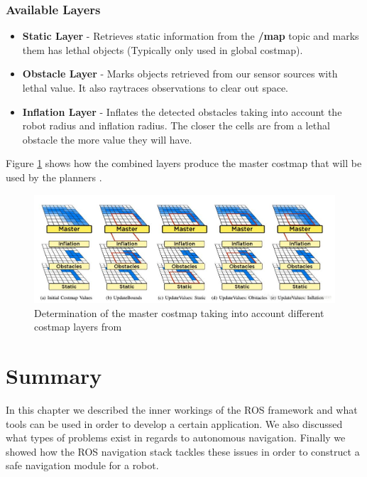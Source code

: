 \subsubsection*{Available Layers}
\begin{itemize}
    \item \textbf{Static Layer} - Retrieves static information from the \textbf{/map} topic and marks them has lethal objects (Typically only used in global costmap).
    \item \textbf{Obstacle Layer} - Marks objects retrieved from our sensor sources with lethal value. It also raytraces observations to clear out space.
    \item \textbf{Inflation Layer} - Inflates the detected obstacles taking into account the robot radius and inflation radius. The closer the cells are from a lethal obstacle the more value they will have.
    
\end{itemize}

Figure \ref{fig:layers1} shows how the combined layers produce the master costmap that will be used by the planners \cite{lu2014layered}.

\begin{figure}[!htb]
    \centering
    \includegraphics[width=\linewidth]{imgs/chapter3/layers1.png}
    \caption[Determination of the master costmap taking into account different costmap layers]{Determination of the master costmap taking into account different costmap layers from \cite{lu2014layered}}
    \label{fig:layers1}
\end{figure}
\section{Summary}
In this chapter we described the inner workings of the ROS framework and what tools can be used in order to develop a certain application. We also discussed what types of problems exist in regards to autonomous navigation. Finally we showed how the ROS navigation stack tackles these issues in order to construct a safe navigation module for a robot.


